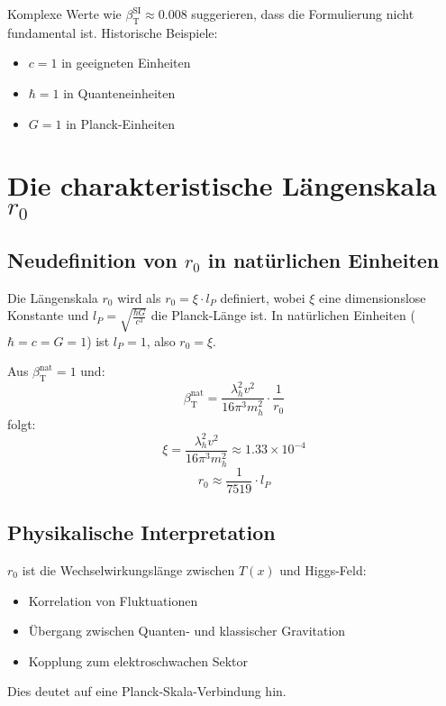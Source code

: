 \documentclass[12pt,a4paper]{article}
\newcommand{\Tfield}{T(x)}
\newcommand{\betaT}{\beta_{\text{T}}}
\begin{document}
	Komplexe Werte wie \(\betaT^{\text{SI}} \approx 0.008\) suggerieren, dass die Formulierung nicht fundamental ist. Historische Beispiele:
	\begin{itemize}
		\item \(c = 1\) in geeigneten Einheiten
		\item \(\hbar = 1\) in Quanteneinheiten
		\item \(G = 1\) in Planck-Einheiten
	\end{itemize}
	
	\section{Die charakteristische Längenskala \(r_0\)}
	
	\subsection{Neudefinition von \(r_0\) in natürlichen Einheiten}
	
	Die Längenskala \(r_0\) wird als \(r_0 = \xi \cdot l_P\) definiert, wobei \(\xi\) eine dimensionslose Konstante und \(l_P = \sqrt{\frac{\hbar G}{c^3}}\) die Planck-Länge ist. In natürlichen Einheiten (\(\hbar = c = G = 1\)) ist \(l_P = 1\), also \(r_0 = \xi\).
	
	Aus \(\betaT^{\text{nat}} = 1\) und:
	\begin{equation}
		\betaT^{\text{nat}} = \frac{\lambda_h^2 v^2}{16\pi^3 m_h^2} \cdot \frac{1}{r_0}
	\end{equation}
	folgt:
	\begin{equation}
		\xi = \frac{\lambda_h^2 v^2}{16\pi^3 m_h^2} \approx 1.33 \times 10^{-4}
	\end{equation}
	\begin{equation}
		r_0 \approx \frac{1}{7519} \cdot l_P
	\end{equation}
	
	\subsection{Physikalische Interpretation}
	
	\(r_0\) ist die Wechselwirkungslänge zwischen \(\Tfield\) und Higgs-Feld:
	\begin{itemize}
		\item Korrelation von Fluktuationen
		\item Übergang zwischen Quanten- und klassischer Gravitation
		\item Kopplung zum elektroschwachen Sektor
	\end{itemize}
	Dies deutet auf eine Planck-Skala-Verbindung hin.
	
\end{document}
